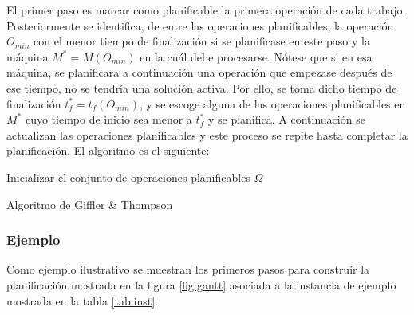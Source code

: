 El primer paso es marcar como planificable la primera operación de cada trabajo. 
%
Posteriormente se identifica, de entre las operaciones planificables, la operación $O_{min}$ con el menor tiempo de finalización si se planificase en 
este paso y la máquina $M^*=M(O_{min})$ en la cuál debe procesarse. 
%
Nótese que si en esa máquina, se planificara a continuación una operación que empezase después de ese tiempo, no se tendría una solución activa.
%
Por ello, se toma dicho tiempo de finalización $t^*_f = t_f(O_{min})$, y se escoge alguna de las operaciones planificables en $M^*$ cuyo tiempo de inicio sea menor
a $t^*_f$ y se planifica.
%
A continuación se actualizan las operaciones planificables y este proceso se repite hasta completar la planificación. 
%
El algoritmo es el siguiente:

\begin{algorithm}[H]
 Inicializar el conjunto de operaciones planificables $\Omega$\;
    \label{alg:GT}
    \caption{Algoritmo de Giffler \& Thompson}
\end{algorithm}
\subsubsection*{Ejemplo}
Como ejemplo ilustrativo se muestran los primeros pasos para construir la planificación mostrada en la figura \ref{fig:gantt} asociada 
a la instancia de ejemplo mostrada en la tabla \ref{tab:inst}.

